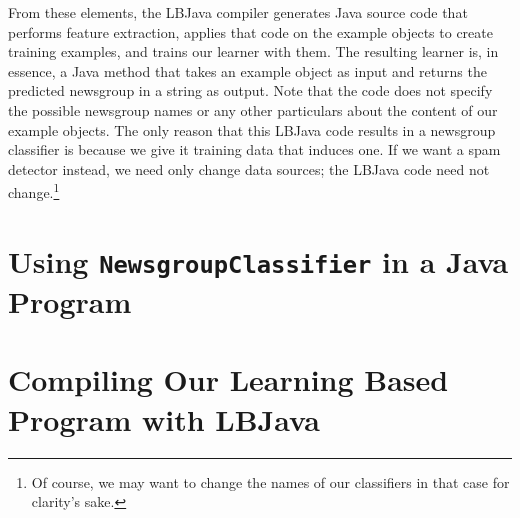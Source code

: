 From these elements, the LBJava compiler generates Java source code that performs
feature extraction, applies that code on the example objects to create
training examples, and trains our learner with them.  The resulting learner
is, in essence, a Java method that takes an example object as input and
returns the predicted newsgroup in a string as output.  Note that the code
does not specify the possible newsgroup names or any other particulars about
the content of our example objects.  The only reason that this LBJava code
results in a newsgroup classifier is because we give it training data that
induces one.  If we want a spam detector instead, we need only change data
sources; the LBJava code need not change.\footnote{Of course, we may want to
change the names of our classifiers in that case for clarity's sake.}


\section{Using {\tt NewsgroupClassifier} in a Java Program}

\section{Compiling Our Learning Based Program with LBJava}

